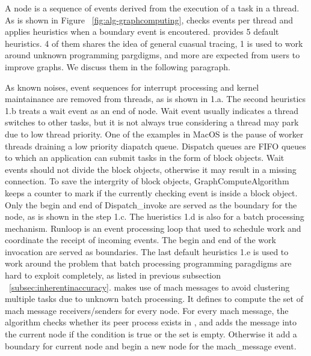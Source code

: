 A node is a sequence of events derived from the execution of a task in a thread.
As is shown in Figure ~\ref{fig:alg-graphcomputing}, \xxx checks events per
thread and applies heuristics when a boundary event is encoutered. \xxx provides
5 default heuristics. 4 of them shares the idea of general cuasual tracing, 1
is used to work around unknown programming pargdigms, and more are expected
from users to improve graphs. We discuss them in the following paragraph.

As known noises, event sequences for interrupt processing and kernel
maintainance are removed from threads, as is shown in 1.a. The second heuristics
1.b treats a wait event as an end of node. Wait event usually indicates a thread
switches to other tasks, but it is not always true considering a thread may park
due to low thread priority. One of the examples in MacOS is the pause of worker
threads draining a low priority diapatch queue. Dispatch queues are FIFO queues
to which an application can submit tasks in the form of block objects. Wait
events should not divide the block objects, otherwise it may result in a missing
connection. To save the intergrity of block objects, \xxx GraphComputeAlgorithm
keeps a counter  to mark if the currently checking event is
inside a block object. Only the begin and end of Dispatch\_invoke are served
as the boundary for the node, as is shown in the step 1.c. The hueristics 1.d
is also for a batch processing mechanism. Runloop is an event processing loop
that used to schedule work and coordinate the receipt of incoming events.
The begin and end of the work invocation are served as boundaries. The last
default heuristics 1.e is used to work around the problem that batch processing
programming paragdigms are hard to exploit completely, as listed in previous
subsection ~\ref{subsec:inherentinaccuracy}. \xxx makes use of mach messages
to avoid clustering multiple tasks due to unknown batch processing. It defines
 to compute the set of mach message receivers/senders for
every node. For every mach message, the algorithm checks whether its peer
process exists in , and adds the message into the current
node if the condition is true or the set is empty. Otherwise it add a boundary
for current node and begin a new node for the mach\_message event.

